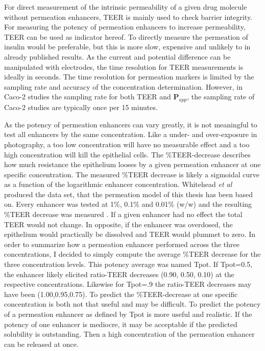 For direct measurement of the intrinsic permeability of a given drug molecule without permeation enhancers, TEER is mainly used to check barrier integrity. For measuring the potency of permeation enhancers to increase permeability, TEER can be used as indicator hereof. To directly measure the permeation of insulin would be preferable, but this is more slow, expensive and unlikely to in already published results. As the current and potential difference can be manipulated with electrodes, the time resolution for TEER measurements is ideally in seconds. The time resolution for permeation markers is limited by the sampling rate and accuracy of the concentration determination. However, in Caco-2 studies the sampling rate for both TEER and $\bm{P}_{app}$, the sampling rate of Caco-2 studies are typically once per 15 minutes.

As the potency of permeation enhancers can vary greatly, it is not meaningful to test all enhancers by the same concentration. Like a under- and over-exposure in photography, a too low concentration will have no measurable effect and a too high concentration will kill the epithelial cells. The \%TEER-decrease describes how much resistance the epithelium looses by a given permeation enhancer at one specific concentration. The measured \%TEER decrease is likely a sigmoidal curve as a function of the logarithmic enhancer concentration. Whitehead \textit{et al} produced the data set, that the permeation model of this thesis has been based on. Every enhancer was tested at 1\%, 0.1\% and 0.01\% (w/w) and the resulting \%TEER decrease was measured \cite{whitehead2008safe}. If a given enhancer had no effect the total TEER would not change. In opposite, if the enhancer was overdosed, the epithelium would practically be dissolved and TEER would plummet to zero. In order to summarize how a permeation enhancer performed across the three concentrations, I decided to simply compute the average \%TEER decrease for the three concentration levels. This potency average was named Tpot. If Tpot=0.5, the enhancer likely elicited ratio-TEER decreases (0.90, 0.50, 0.10) at the respective concentrations. Likewise for Tpot=.9 the ratio-TEER decreases may have been (1.00,0.95,0.75). To predict the \%TEER-decrease at one specific concentration is both not that useful and may be difficult. To predict the potency of a permeation enhancer as defined by Tpot is more useful and realistic. If the potency of one enhancer is mediocre, it may be acceptable if the predicted solubility is outstanding. Then a high concentration of the permeation enhancer can be released at once.

